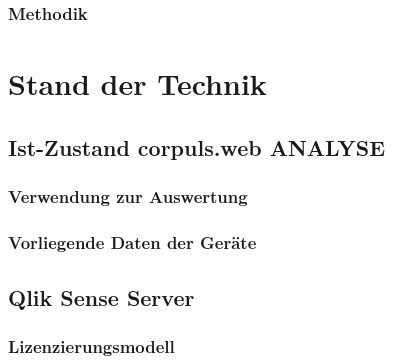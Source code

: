 \documentclass[11pt]{article}
\begin{document}
\subsubsection{Methodik}


\section{Stand der Technik} 
\lipsum[1-21]
\subsection{Ist-Zustand corpuls.web ANALYSE}
\subsubsection{Verwendung zur Auswertung}
\subsubsection{Vorliegende Daten der Geräte}
\subsection{Qlik Sense Server}
\subsubsection{Lizenzierungsmodell}
\end{document}
